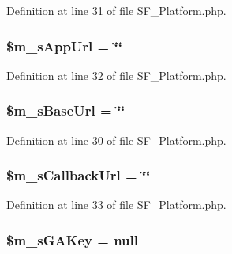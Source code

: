 Definition at line 31 of file SF\_\-Platform.php.

\hypertarget{classSF__Platform_ab35950231d123d9279d8b0b3b0878609}{
\subsubsection[{\$m\_\-sAppUrl}]{\setlength{\rightskip}{0pt plus 5cm}\$m\_\-sAppUrl = \char`\"{}\char`\"{}}}
\label{classSF__Platform_ab35950231d123d9279d8b0b3b0878609}


Definition at line 32 of file SF\_\-Platform.php.

\hypertarget{classSF__Platform_a12f1f6a87e26bffa94c2b7e5ea3885c9}{
\subsubsection[{\$m\_\-sBaseUrl}]{\setlength{\rightskip}{0pt plus 5cm}\$m\_\-sBaseUrl = \char`\"{}\char`\"{}}}
\label{classSF__Platform_a12f1f6a87e26bffa94c2b7e5ea3885c9}


Definition at line 30 of file SF\_\-Platform.php.

\hypertarget{classSF__Platform_a5c010b1e93c651cf5024339d568fb0d1}{
\subsubsection[{\$m\_\-sCallbackUrl}]{\setlength{\rightskip}{0pt plus 5cm}\$m\_\-sCallbackUrl = \char`\"{}\char`\"{}}}
\label{classSF__Platform_a5c010b1e93c651cf5024339d568fb0d1}


Definition at line 33 of file SF\_\-Platform.php.

\hypertarget{classSF__Platform_a450e8067b60f9369bc4370c74ea0f862}{
\subsubsection[{\$m\_\-sGAKey}]{\setlength{\rightskip}{0pt plus 5cm}\$m\_\-sGAKey = null}}
\label{classSF__Platform_a450e8067b60f9369bc4370c74ea0f862}


